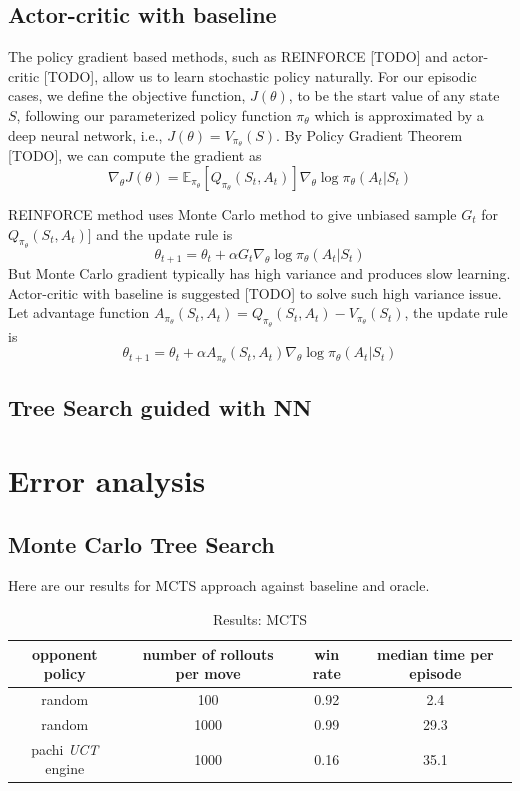 \documentclass{article}
\begin{document}
\subsection{Actor-critic with baseline}
The policy gradient based methods, such as REINFORCE [TODO] and actor-critic [TODO], allow us to learn stochastic policy naturally. For our episodic cases, we define the objective function, $J(\theta)$, to be the start value of any state $S$, following our parameterized policy function $\pi_{\theta}$ which is approximated by a deep neural network, i.e.,  $J(\theta) = V_{\pi_{\theta}}(S)$. By Policy Gradient Theorem [TODO], we can compute the gradient as
$$ \nabla_{\theta} J(\theta) =  \mathbb E_{\pi_{\theta}} [ 
Q_{\pi_{\theta}}(S_t, A_t)] 
\nabla_{\theta} \log \pi_{\theta}(A_t|S_t) 
$$

REINFORCE method uses Monte Carlo method to give unbiased sample $G_t$ for $Q_{\pi_{\theta}}(S_t, A_t)]$ and the update rule is
$$ \theta_{t+1} = \theta_{t} + \alpha 
G_t 
\nabla_{\theta} \log \pi_{\theta}(A_t|S_t) 
$$
But Monte Carlo gradient typically has high variance and produces slow learning. Actor-critic with baseline is suggested [TODO] to solve such high variance issue. Let advantage function $
A_{\pi_{\theta}}(S_t, A_t) 
= 
Q_{\pi_{\theta}}(S_t, A_t)  - 
V_{\pi_{\theta}}(S_t) 
$, the update rule is
$$ \theta_{t+1} = \theta_{t} + \alpha 
A_{\pi_{\theta}}(S_t, A_t) 
\nabla_{\theta} \log \pi_{\theta}(A_t|S_t) 
$$

\subsection{Tree Search guided with NN}

\section{Error analysis}
\subsection{Monte Carlo Tree Search}
Here are our results for MCTS approach against baseline and oracle.
\begin{table}
  \caption{Results: MCTS}
  \label{tbl:mcts}
  \centering
  \begin{tabular}{c | c | c | c}
    opponent policy    &  number of rollouts per move & win rate  & median time per episode \\
    \hline
    random            &  100 &  0.92  & 2.4 \\
    random            &  1000 &  0.99  & 29.3 \\
    pachi \textit{UCT} engine  &  1000 &  0.16  & 35.1 \\
  \end{tabular}
\end{table}
\end{document}
